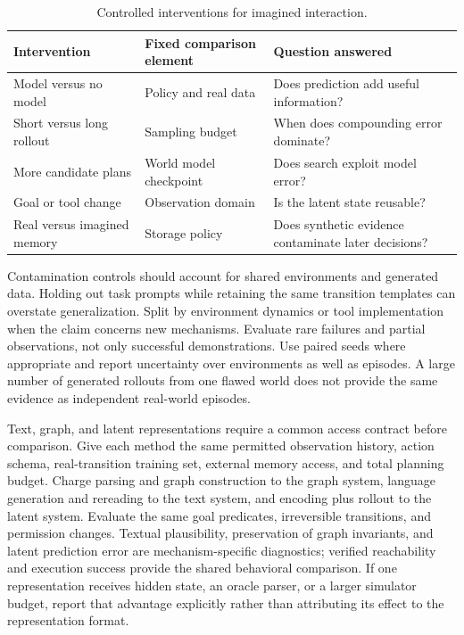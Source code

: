 {\small\setlength{\tabcolsep}{3pt}
\begin{table}[!htbp]
\centering
\caption{Controlled interventions for imagined interaction.}\label{tab:C06:experiments}
\begin{tabular}{L{29mm}L{37mm}L{40mm}}

\toprule Intervention & Fixed comparison element & Question answered\\\midrule
Model versus no model & Policy and real data & Does prediction add useful information?\\
Short versus long rollout & Sampling budget & When does compounding error dominate?\\
More candidate plans & World model checkpoint & Does search exploit model error?\\
Goal or tool change & Observation domain & Is the latent state reusable?\\
Real versus imagined memory & Storage policy & Does synthetic evidence contaminate later decisions?\\
\bottomrule
\end{tabular}
\end{table}
}

Contamination controls should account for shared environments and generated data. Holding out task prompts while retaining the same transition templates can overstate generalization. Split by environment dynamics or tool implementation when the claim concerns new mechanisms. Evaluate rare failures and partial observations, not only successful demonstrations. Use paired seeds where appropriate and report uncertainty over environments as well as episodes. A large number of generated rollouts from one flawed world does not provide the same evidence as independent real-world episodes.

Text, graph, and latent representations require a common access contract before comparison. Give each method the same permitted observation history, action schema, real-transition training set, external memory access, and total planning budget. Charge parsing and graph construction to the graph system, language generation and rereading to the text system, and encoding plus rollout to the latent system. Evaluate the same goal predicates, irreversible transitions, and permission changes. Textual plausibility, preservation of graph invariants, and latent prediction error are mechanism-specific diagnostics; verified reachability and execution success provide the shared behavioral comparison. If one representation receives hidden state, an oracle parser, or a larger simulator budget, report that advantage explicitly rather than attributing its effect to the representation format.

